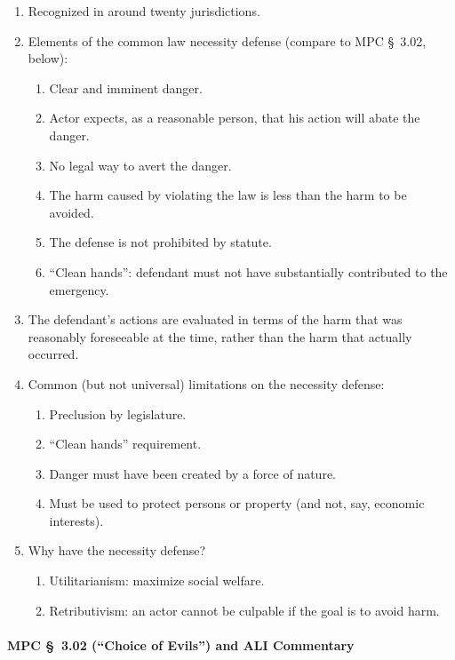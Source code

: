 \begin{enumerate}
    \item Recognized in around twenty jurisdictions.
    \item Elements of the common law necessity defense (compare to MPC \S\ 
    3.02, below):
    \begin{enumerate}
        \item Clear and imminent danger.
        \item Actor expects, as a reasonable person, that his action will 
        abate the danger.
        \item No legal way to avert the danger.
        \item The harm caused by violating the law is less than the harm to be 
        avoided.
        \item The defense is not prohibited by statute.
        \item ``Clean hands'': defendant must not have substantially 
        contributed to the emergency.
    \end{enumerate}
    \item The defendant's actions are evaluated in terms of the harm that was 
    reasonably foreseeable at the time, rather than the harm that actually 
    occurred.
    \item Common (but not universal) limitations on the necessity defense:
    \begin{enumerate}
        \item Preclusion by legislature.
        \item ``Clean hands'' requirement.
        \item Danger must have been created by a force of nature.
        \item Must be used to protect persons or property (and not, say, 
        economic interests).
    \end{enumerate}
    \item Why have the necessity defense?
    \begin{enumerate}
        \item Utilitarianism: maximize social welfare.
        \item Retributivism: an actor cannot be culpable if the goal is to 
        avoid harm.
    \end{enumerate}
\end{enumerate}

\paragraph{MPC \S\ 3.02 (``Choice of Evils'') and ALI Commentary}

